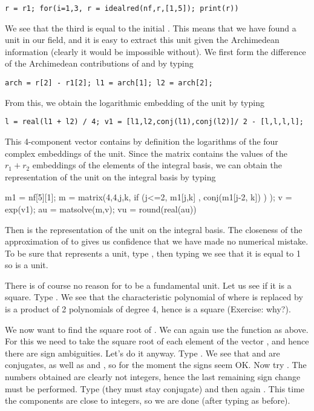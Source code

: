\centerline{\tt r = r1; for(i=1,3, r = idealred(nf,r,[1,5]); print(r))}

We see that the third  is equal to the initial . This means
that we have found a unit in our field, and it is easy to extract this unit
given the Archimedean information (clearly it would be impossible without).
We first form the difference of the Archimedean contributions of  and
 by typing

\centerline{\tt arch = r[2] - r1[2]; l1 = arch[1]; l2 = arch[2];}

From this, we obtain the logarithmic embedding of the unit by typing

\centerline{\tt l = real(l1 + l2) / 4;
                v1 = [l1,l2,conj(l1),conj(l2)]\til / 2 - [l,l,l,l]\til; }

This 4-component vector contains by definition the logarithms of the
four complex embeddings of the unit. Since the matrix 
contains the values of the $r_1+r_2$ embeddings of the elements of the
integral basis, we can obtain the representation of the unit on the
integral basis by typing

\bprog\obr
\q m1 = nf[5][1];
\q m = matrix(4,4,j,k,
\q\q  if (j<=2,
\q\q\q  m1[j,k]
\q\q ,
\q\q\q  conj(m1[j-2, k])
\q\q)
\q );
\q v = exp(v1);
\q au = matsolve(m,v);
\q vu = round(real(au))
\cbr\eprog

Then  is the representation of the unit on the integral basis.
The closeness of the approximation of  to  gives us
confidence that we have made no numerical mistake. To be sure that 
represents a unit, type , then typing
 we see that it is equal to 1 so  is a unit.

There is of course no reason for  to be a fundamental unit. Let us see
if it is a square. Type .
We see that the characteristic polynomial of  where  is
replaced by  is a product of 2 polynomials of degree 4, hence
 is a square (Exercise: why?).

We now want to find the square root of . We can again use the
 function as above. For this we need to take the square
root of each element of the vector , and hence there are
sign ambiguities. Let's do it anyway. Type . We see that
 and  are conjugates, as well as  and ,
so for the moment the signs seem OK. Now try . The
numbers obtained are clearly not integers, hence the last remaining sign
change must be performed. Type  (they must
stay conjugate) and then again . This time the
components are close to integers, so we are done (after typing
 as before).

